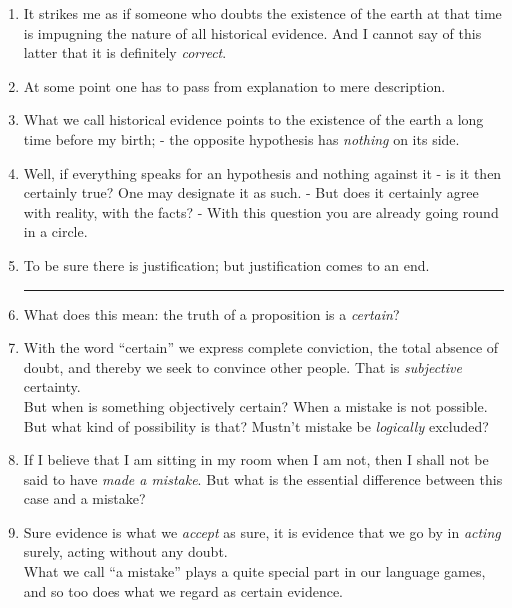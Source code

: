 \documentclass{book}
\begin{document}
\begin{enumerate}
\item
It strikes me as if someone who doubts the existence of the earth at that time
is impugning the nature of all historical evidence. And I cannot say of this
latter that it is definitely \emph{correct}.

\item
At some point one has to pass from explanation to mere description.

\item
What we call historical evidence points to the existence of the earth a long
time before my birth; - the opposite hypothesis has \emph{nothing} on its side.

\item
Well, if everything speaks for an hypothesis and nothing against it - is it
then certainly true? One may designate it as such. - But does it certainly
agree with reality, with the facts? - With this question you are already going
round in a circle.

\item
To be sure there is justification; but justification comes to an end.

\begin{center}\rule{0.5\linewidth}{\linethickness}\end{center}

\item
What does this mean: the truth of a proposition is a \emph{certain}?

\item
With the word ``certain'' we express complete conviction, the total absence of
doubt, and thereby we seek to convince other people. That is \emph{subjective}
certainty. \\
But when is something objectively certain? When a mistake is not possible. But
what kind of possibility is that? Mustn't mistake be \emph{logically} excluded?

\item
If I believe that I am sitting in my room when I am not, then I shall not be
said to have \emph{made a mistake}. But what is the essential difference
between this case and a mistake?

\item
Sure evidence is what we \emph{accept} as sure, it is evidence that we go by in
\emph{acting} surely, acting without any doubt. \\
What we call ``a mistake'' plays a quite special part in our language games,
and so too does what we regard as certain evidence.


\end{enumerate}
\end{document}
